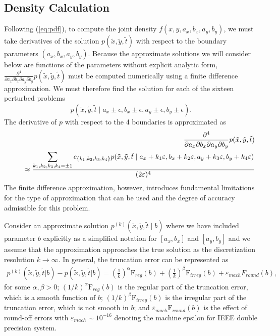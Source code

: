 \subsection{Density Calculation} \label{sec:likelihood-calc} Following
(\ref{eq:pdf}), to compute the joint density $f(x,y,a_x,b_x,a_y,b_y)$,
we must take derivatives of the solution
$p(\tilde{x},\tilde{y},\tilde{t})$ with respect to the boundary
parameters $(a_x, b_x, a_y, b_y)$. Because the approximate solutions
we will consider below are functions of the parameters without
explicit analytic form,
$\frac{\partial^4}{\partial a_x\partial b_x \partial a_y \partial
  b_y}p(\tilde{x},\tilde{y},\tilde{t})$ must be computed numerically
using a finite difference approximation. We must therefore find the
solution for each of the sixteen perturbed problems
\[
  p(\tilde{x},\tilde{y},\tilde{t} \mid a_x \pm \epsilon, b_x \pm \epsilon, a_y \pm \epsilon, b_y
  \pm \epsilon).
\]
The derivative of $p$ with respect to the 4 boundaries is approximated
as
\begin{eqnarray*}
& & \frac{\partial^4}{\partial a_x \partial b_x \partial a_y \partial b_y} p(\tilde{x},\tilde{y},\tilde{t}) 
\nonumber \\
& & \hspace*{0.5cm} \approx \frac{\displaystyle \sum_{k_1, k_2, k_3, k_4 = \pm 1}
c_{\{ k_1, k_2, k_3, k_4 \} } p( \tilde{x},\tilde{y},\tilde{t} \mid a_x+k_1 \varepsilon, b_x+k_2 \varepsilon, 
a_y+k_3 \varepsilon, b_y+k_4 \varepsilon) }{(2 \varepsilon )^4} 
\nonumber
\end{eqnarray*}
The finite difference approximation, however, introduces fundamental
limitations for the type of approximation that can be used and the
degree of accuracy admissible for this problem.

Consider an approximate solution
$p^{(k)}( \tilde{x},\tilde{y},\tilde{t} \mid b)$ where we
have included parameter $b $ explicitly as a simplified notation for
$[a_x, b_x]$ and $[a_y, b_y]$ and we assume that the approximation
approaches the true solution as the discretization resolution
$k \to \infty$. In general, the truncation error can be represented as
\begin{align}
  p^{(k)}(\tilde{x},\tilde{y},\tilde{t} | b) - p(\tilde{x},\tilde{y},\tilde{t} | b) = \left( \frac{1}{k}
  \right)^{\alpha} \mbox{F}_{reg}(b) + \left( \frac{1}{k}
  \right)^{\beta}\mbox{F}_{irreg}(b) + \varepsilon_{mach}F_{round}(b), \label{eq:trunc-error}
\end{align}
for some $\alpha, \beta > 0$; $(1/k)^{\alpha} \mbox{F}_{reg}(b) $ is
the regular part of the truncation error, which is a smooth function of $b$;
$(1/k)^{\beta} \mbox{F}_{irreg}(b) $ is the irregular part of the
truncation error, which is not smooth in $b$; and $\varepsilon_{mach} \mbox{F}_{round}(b) $ is the
effect of round-off errors with $\varepsilon_{mach} \sim 10^{-16}$
denoting the machine epsilon for IEEE double precision system.

